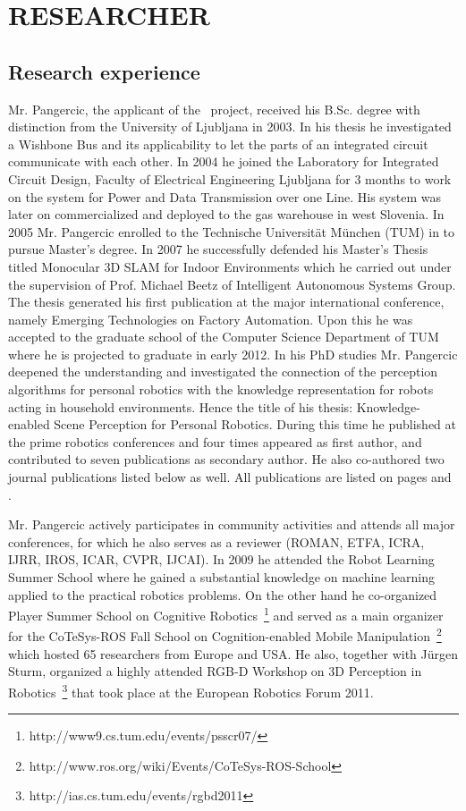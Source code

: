 \section{RESEARCHER} %
\label{sec:researcher}
\subsection{Research experience}
Mr. Pangercic, the applicant of the \ksem\ project, received his B.Sc. degree
with distinction from the University of Ljubljana in 2003. In his thesis he investigated
a Wishbone Bus and its applicability to let the parts of an integrated circuit communicate with each other.
In 2004 he joined the Laboratory for Integrated Circuit Design, Faculty of Electrical Engineering
Ljubljana for 3 months to work on the system for Power and Data Transmission over one Line.
His system was later on commercialized and deployed to the gas warehouse in west Slovenia.
In 2005 Mr. Pangercic enrolled to the Technische Universit\"at M\"unchen (TUM) in to pursue Master's
degree. In 2007 he successfully defended his Master's Thesis titled Monocular 3D SLAM for Indoor Environments
which he carried out under the supervision of Prof. Michael Beetz of Intelligent Autonomous Systems Group.
The thesis generated his first publication at the major international conference, namely
Emerging Technologies on Factory Automation. Upon this he was accepted to the graduate school
of the Computer Science Department of TUM where he is projected to graduate in early 2012.
In his PhD studies Mr. Pangercic deepened the understanding and investigated the connection of the 
perception algorithms for personal robotics with the knowledge representation for robots
acting in household environments. Hence the title of his thesis: Knowledge-enabled Scene Perception for Personal Robotics.
During this time he published at the prime robotics conferences and four times appeared as first author, 
and contributed to seven publications as secondary author. He also co-authored two journal publications listed below as well.
All publications are listed on pages  and .

Mr. Pangercic actively participates in community activities and attends all major conferences, for 
which he also serves as a reviewer (ROMAN, ETFA, ICRA, IJRR, IROS, ICAR, CVPR, IJCAI). In 2009 he 
attended the Robot Learning Summer School where he gained a substantial knowledge on machine learning 
applied to the practical robotics problems. On the other hand he co-organized Player Summer School on 
Cognitive Robotics~\footnote{http://www9.cs.tum.edu/events/psscr07/} and 
served as a main organizer for the CoTeSys-ROS Fall School on Cognition-enabled Mobile 
Manipulation~\footnote{http://www.ros.org/wiki/Events/CoTeSys-ROS-School} which hosted 
65 researchers from Europe and USA. He also, together with J\"urgen Sturm, organized a highly 
attended RGB-D Workshop on 3D Perception in Robotics~\footnote{http://ias.cs.tum.edu/events/rgbd2011} 
that took place at the European Robotics Forum 2011.

